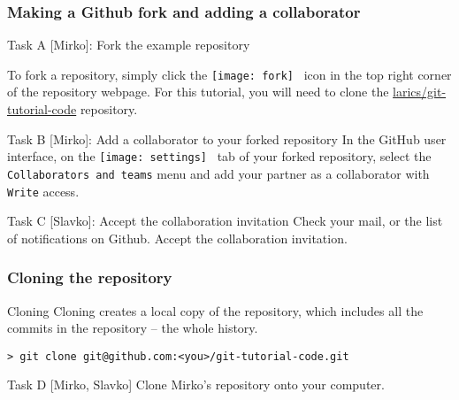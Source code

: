 
\begin{frame}[fragile]

\frametitle{Making a Github fork and adding a collaborator}

\begin{block}{Task A [Mirko]: Fork the example repository}

	To fork a repository, simply click the \texttt{[image: fork]} \, icon in the top right corner of the repository webpage. For this tutorial, you will need to clone the \href{https://github.com/larics/git-tutorial-code.git}{larics/git-tutorial-code} repository.
\end{block}

\begin{block}{Task B [Mirko]: Add a collaborator to your forked repository}
In the GitHub user interface, on the \texttt{[image: settings]} \, tab of your forked repository, select the \texttt{Collaborators and teams} menu and add your partner as a collaborator with \texttt{Write} access.
\end{block}

\begin{block}{Task C [Slavko]: Accept the collaboration invitation}
Check your mail, or the list of notifications on Github. Accept the collaboration invitation.
\end{block}

\end{frame}


\begin{frame}[fragile]

\frametitle{Cloning the repository}

\begin{block}{Cloning}
Cloning creates a local copy of the repository, which includes all the commits in the repository -- the whole history.
\begin{verbatim}
> git clone git@github.com:<you>/git-tutorial-code.git
\end{verbatim}
\end{block}

\begin{block}{Task D [Mirko, Slavko]}
Clone Mirko's repository onto your computer.
\end{block}

	
\end{frame}

